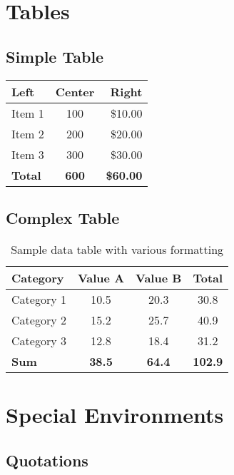 \documentclass[12pt,a4paper,twoside]{article}
\begin{document}
\section{Tables}

\subsection{Simple Table}

\begin{center}
\begin{tabular}{|l|c|r|}
\hline
Left & Center & Right \\
\hline
Item 1 & 100 & \$10.00 \\
Item 2 & 200 & \$20.00 \\
Item 3 & 300 & \$30.00 \\
\hline
\textbf{Total} & \textbf{600} & \textbf{\$60.00} \\
\hline
\end{tabular}
\end{center}

\subsection{Complex Table}

\begin{table}[htbp]
\centering
\caption{Sample data table with various formatting}
\label{tab:sample}
\begin{tabular}{|l|c|c|c|}
\hline
\textbf{Category} & \textbf{Value A} & \textbf{Value B} & \textbf{Total} \\
\hline
Category 1 & 10.5 & 20.3 & 30.8 \\
Category 2 & 15.2 & 25.7 & 40.9 \\
Category 3 & 12.8 & 18.4 & 31.2 \\
\hline
\textbf{Sum} & \textbf{38.5} & \textbf{64.4} & \textbf{102.9} \\
\hline
\end{tabular}
\end{table}

\section{Special Environments}

\subsection{Quotations}
\end{document}
